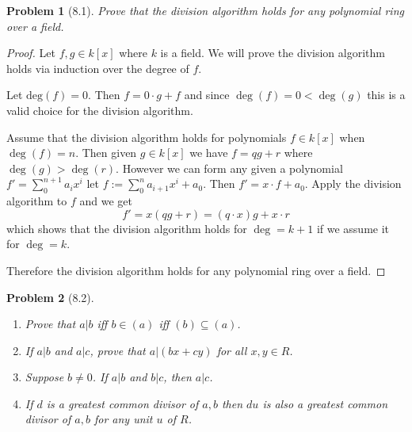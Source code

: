 \documentclass[10pt]{article}
\newcommand{\sk}{\vskip 10mm}
\theoremstyle{plain}
\newtheorem{problem}{Problem}
\theoremstyle{remark}
\begin{document}
\sk

\begin{problem}[8.1]
  Prove that the division algorithm holds for any polynomial ring over a field.
\end{problem}

\begin{proof}
  Let $f,g\in k[x]$ where $k$ is a field. We will prove the division algorithm
  holds via induction over the degree of $f$.

  Let $\text{deg}(f)=0$. Then $f=0\cdot g+f$ and since $\deg(f)=0<\deg(g)$ this is
  a valid choice for the division algorithm.

  Assume that the division algorithm holds for polynomials $f\in k[x]$ when
  $\deg(f)= n$. Then given $g\in k[x]$ we have $f=qg+r$ where $\deg(g)>\deg(r)$.
  However we can form any given a polynomial $f'=\sum_0^{n+1}a_ix^i$ let
  $f:= \sum_0^na_{i+1}x^i+a_0$. Then $f'=x\cdot f+a_0$. Apply the division algorithm to
  $f$ and we get
  \[ f'=x(qg+r)=(q\cdot x)g + x\cdot r\]
  which shows that the division algorithm holds for $\deg=k+1$ if we assume
  it for $\deg =k$.

  Therefore the division algorithm holds for any polynomial ring over a field.
\end{proof}

\sk

\begin{problem}[8.2]
  \begin{enumerate}
  \item Prove that $a|b$ iff $b\in(a)$ iff $(b)\subseteq(a)$.
  \item If $a|b$ and $a|c$, prove that $a|(bx+cy)$ for all $x,y\in R$.
  \item Suppose $b\neq 0$. If $a|b$ and $b|c$, then $a|c$.
  \item If $d$ is a greatest common divisor of $a,b$ then $du$
    is also a greatest common divisor of $a,b$ for any unit $u$
    of $R$.
  \end{enumerate}
\end{problem}
\end{document}
